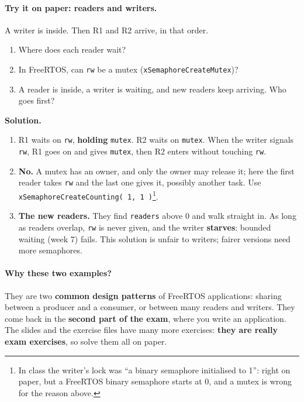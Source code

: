 \paragraph{Try it on paper: readers and writers.} A writer is inside. Then R1 and R2 arrive, in that order.
\begin{enumerate}
    \item Where does each reader wait?
    \item In FreeRTOS, can \texttt{rw} be a mutex (\texttt{xSemaphoreCreateMutex})?
    \item A reader is inside, a writer is waiting, and new readers keep arriving. Who goes first?
\end{enumerate}
\textbf{Solution.}
\begin{enumerate}
    \item R1 waits on \texttt{rw}, \textbf{holding} \texttt{mutex}. R2 waits on \texttt{mutex}. When the writer signals \texttt{rw}, R1 goes on and gives \texttt{mutex}, then R2 enters without touching \texttt{rw}.
    \item \textbf{No.} A mutex has an owner, and only the owner may release it; here the first reader takes \texttt{rw} and the last one gives it, possibly another task. Use \texttt{xSemaphoreCreateCounting( 1, 1 )}\footnote{In class the writer's lock was ``a binary semaphore initialised to 1'': right on paper, but a FreeRTOS binary semaphore starts at 0, and a mutex is wrong for the reason above.}.
    \item \textbf{The new readers.} They find \texttt{readers} above 0 and walk straight in. As long as readers overlap, \texttt{rw} is never given, and the writer \textbf{starves}: bounded waiting (week 7) fails. This solution is unfair to writers; fairer versions need more semaphores.
\end{enumerate}

\paragraph{Why these two examples?} They are two \textbf{common design patterns} of FreeRTOS applications: sharing between a producer and a consumer, or between many readers and writers. They come back in the \textbf{second part of the exam}, where you write an application. The slides and the exercise files have many more exercises: \textbf{they are really exam exercises}, so solve them all on paper.


